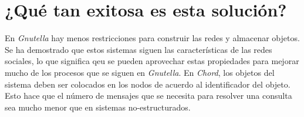 \section{¿Qué tan exitosa es esta solución?} 
En \emph{Gnutella} hay menos restricciones para construir las redes y almacenar objetos. Se ha demostrado que estos sistemas siguen las características de las redes sociales, lo que significa qeu se pueden aprovechar estas propiedades para mejorar mucho de los procesos que se siguen en \emph{Gnutella}. En \emph{Chord}, los objetos del sistema deben ser colocados en los nodos de acuerdo al identificador del objeto. Esto hace que el número de mensajes que se necesita para resolver una consulta sea mucho menor que en sistemas no-estructurados.